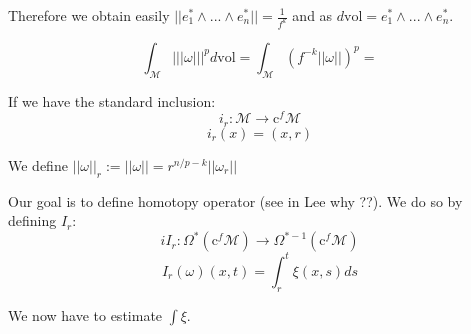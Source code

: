 \documentclass[licencjacka]{pracamgr}
\begin{document}
\normalsize

Therefore we obtain easily $||e_1^{\ast} \wedge ... \wedge e_n^\ast || =
\frac{1}{f^k}$ and as $d\mathrm{vol} = e_1^{\ast} \wedge ... \wedge e_n^\ast $.



\[
    \int_{\mathcal{M}} ||| \omega |||^p d\mathrm{vol} = 
    \int_{\mathcal{M}}  (f^{-k}|| \omega ||)^p =  
\]

If we have the standard inclusion:
\[
    i_r: \mathcal{M} \rightarrow \mathrm{c}^f \mathcal{M}
\]
\[
    i_r(x) = (x, r)
\]

We define $|| \omega ||_r := || \omega || = r^{n/p - k} ||\omega_r||$

Our goal is to define homotopy operator (see in Lee why ??). We do so by
defining $I_r$:
\[
  i I_r: \Omega^\ast( \mathrm{c}^f \mathcal{M} ) \rightarrow
  \Omega^{\ast-1}(\mathrm{c}^f \mathcal{M} ) 
\]
\[
    I_r(\omega)(x, t) = \int_r^t \xi(x, s) ds
\]

We now have to estimate $\int \xi$.



\end{document}
